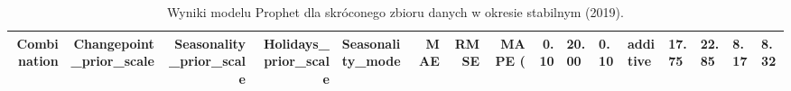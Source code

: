 \begin{table}
\caption{Wyniki modelu Prophet dla skróconego zbioru danych w okresie stabilnym (2019).}
\label{tab:prophet_results_short_stable}
\begin{tabular}{rrrrlrrrr}
\toprule
Combination & Changepoint_prior_scale & Seasonality_prior_scale & Holidays_prior_scale & Seasonality_mode & MAE & RMSE & MAPE (%
 & 0.10 & 20.00 & 0.10 & additive & 17.75 & 22.85 & 8.17 & 8.32 \\
\bottomrule
\end{tabular}
\end{table}
